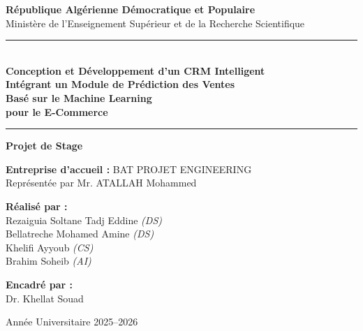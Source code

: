 \documentclass[12pt,a4paper]{report}
\begin{document}
\hypersetup{pageanchor=false}

\begin{titlepage}
\begin{center}

\vspace*{1cm}

{\Large \textbf{R\'{e}publique Alg\'{e}rienne D\'{e}mocratique et Populaire}}\\[0.3cm]
{\large Minist\`{e}re de l'Enseignement Sup\'{e}rieur et de la Recherche Scientifique}

\vspace{1.5cm}

\rule{\linewidth}{0.5pt}\\[0.5cm]
{\Huge \bfseries Conception et D\'{e}veloppement d'un CRM Intelligent}\\[0.3cm]
{\LARGE \bfseries Int\'{e}grant un Module de Pr\'{e}diction des Ventes}\\[0.2cm]
{\LARGE \bfseries Bas\'{e} sur le Machine Learning}\\[0.2cm]
{\Large \bfseries pour le E-Commerce}\\[0.3cm]
\rule{\linewidth}{0.5pt}

\vspace{1cm}

{\Large \textbf{Projet de Stage}}\\[0.3cm]

\vspace{1cm}

{\large \textbf{Entreprise d'accueil :} BAT PROJET ENGINEERING}\\[0.2cm]
{\large Repr\'{e}sent\'{e}e par Mr. ATALLAH Mohammed}

\vspace{1cm}

\begin{minipage}{0.45\textwidth}
\begin{flushleft}
{\large \textbf{R\'{e}alis\'{e} par :}}\\[0.3cm]
{\large Rezaiguia Soltane Tadj Eddine \textit{(DS)}}\\[0.15cm]
{\large Bellatreche Mohamed Amine \textit{(DS)}}\\[0.15cm]
{\large Khelifi Ayyoub \textit{(CS)}}\\[0.15cm]
{\large Brahim Soheib \textit{(AI)}}
\end{flushleft}
\end{minipage}
\hfill
\begin{minipage}{0.45\textwidth}
\begin{flushright}
{\large \textbf{Encadr\'{e} par :}}\\[0.3cm]
{\large Dr. Khellat Souad}
\end{flushright}
\end{minipage}

\vfill

{\large Ann\'{e}e Universitaire 2025--2026}

\end{center}
\end{titlepage}
\end{document}
